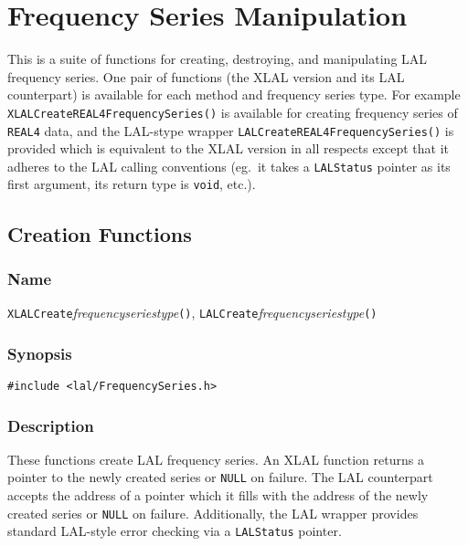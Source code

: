 \clearpage
\section{Frequency Series Manipulation}
\label{s:FrequencySeriesManipulation}

This is a suite of functions for creating, destroying, and manipulating LAL
frequency series.  One pair of functions (the XLAL version and its LAL
counterpart) is available for each method and frequency series type.  For
example \texttt{XLALCreateREAL4FrequencySeries()} is available for creating
frequency series of \texttt{REAL4} data, and the LAL-stype wrapper
\texttt{LALCreateREAL4FrequencySeries()} is provided which is equivalent to
the XLAL version in all respects except that it adheres to the LAL calling
conventions (eg.\ it takes a \texttt{LALStatus} pointer as its first
argument, its return type is \texttt{void}, etc.).

\subsection{Creation Functions}

\subsubsection{Name}

\texttt{XLALCreate}\textit{frequencyseriestype}\texttt{()},
\texttt{LALCreate}\textit{frequencyseriestype}\texttt{()}

\subsubsection{Synopsis}

\begin{verbatim}
#include <lal/FrequencySeries.h>
\end{verbatim}


\subsubsection{Description}

These functions create LAL frequency series.  An XLAL function returns a
pointer to the newly created series or \texttt{NULL} on failure.  The LAL
counterpart accepts the address of a pointer which it fills with the
address of the newly created series or \texttt{NULL} on failure.
Additionally, the LAL wrapper provides standard LAL-style error checking
via a \texttt{LALStatus} pointer.


